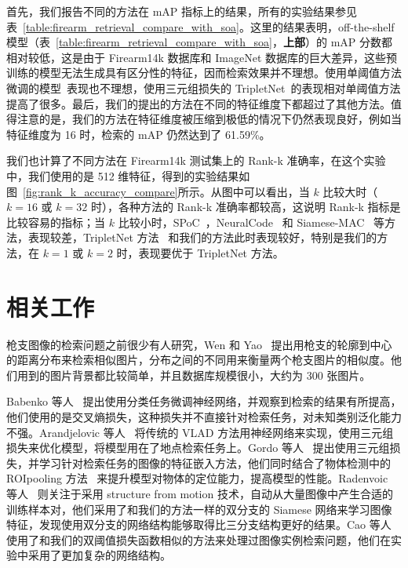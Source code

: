 首先，我们报告不同的方法在 mAP 指标上的结果，所有的实验结果参见表~\ref{table:firearm_retrieval_compare_with_soa}。这里的结果表明，off-the-shelf 模型（表~\ref{table:firearm_retrieval_compare_with_soa}，\textbf{上部}）的 mAP 分数都相对较低，这是由于 Firearm14k 数据库和 ImageNet 数据库的巨大差异，这些预训练的模型无法生成具有区分性的特征，因而检索效果并不理想。使用单阈值方法微调的模型~\cite{Radenovic2016CNNIR}表现也不理想，使用三元组损失的 TripletNet~\cite{Gordo2016DeepIR}的表现相对单阈值方法提高了很多。最后，我们的提出的方法在不同的特征维度下都超过了其他方法。值得注意的是，我们的方法在特征维度被压缩到极低的情况下仍然表现良好，例如当特征维度为 16 时，检索的 mAP 仍然达到了 61.59\%。

我们也计算了不同方法在 Firearm14k 测试集上的 Rank-k 准确率，在这个实验中，我们使用的是 512 维特征，得到的实验结果如图~\ref{fig:rank_k_accuracy_compare}所示。从图中可以看出，当 $k$ 比较大时（$k=16$ 或 $k=32$ 时），各种方法的 Rank-k 准确率都较高，这说明 Rank-k 指标是比较容易的指标；当 $k$ 比较小时，SPoC~\cite{Babenko2015AggregatingLD}，NeuralCode~\cite{Babenko2014NeuralCF} 和 Siamese-MAC~\cite{Radenovic2016CNNIR} 等方法，表现较差，TripletNet 方法~\cite{Gordo2016DeepIR} 和我们的方法此时表现较好，特别是我们的方法，在 $k=1$ 或 $k=2$ 时，表现要优于 TripletNet 方法。

\section{相关工作}\label{sec:double_margin_related_work}
枪支图像的检索问题之前很少有人研究，Wen 和 Yao~\cite{Wen2005PistolIR} 提出用枪支的轮廓到中心的距离分布来检索相似图片，分布之间的不同用来衡量两个枪支图片的相似度。他们用到的图片背景都比较简单，并且数据库规模很小，大约为 300 张图片。

Babenko 等人~\cite{Babenko2014NeuralCF} 提出使用分类任务微调神经网络，并观察到检索的结果有所提高，他们使用的是交叉熵损失，这种损失并不直接针对检索任务，对未知类别泛化能力不强。Arandjelovic 等人~\cite{Arandjelovic2016NetVLADCA} 将传统的 VLAD 方法用神经网络来实现，使用三元组损失来优化模型，将模型用在了地点检索任务上。Gordo 等人~\cite{Gordo2016DeepIR} 提出使用三元组损失，并学习针对检索任务的图像的特征嵌入方法，他们同时结合了物体检测中的 ROIpooling 方法~\cite{Ren2017FasterRT} 来提升模型对物体的定位能力，提高模型的性能。Radenvoic 等人~\cite{Radenovic2016CNNIR} 则关注于采用 structure from motion 技术，自动从大量图像中产生合适的训练样本对，他们采用了和我们的方法一样的双分支的 Siamese 网络来学习图像特征，发现使用双分支的网络结构能够取得比三分支结构更好的结果。Cao 等人~\cite{Cao2016QuartetnetLF} 使用了和我们的双阈值损失函数相似的方法来处理过图像实例检索问题，他们在实验中采用了更加复杂的网络结构。

